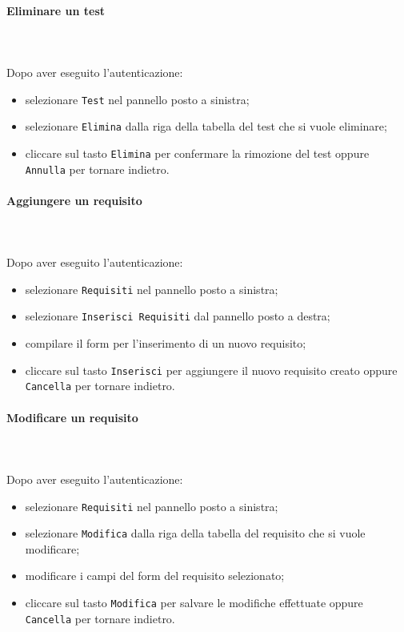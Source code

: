 	\paragraph{Eliminare un test} \mbox{}\\ \mbox{}\\
	Dopo aver eseguito l'autenticazione:
	\begin{itemize}
		\item selezionare \texttt{Test} nel pannello posto a sinistra;
		\item selezionare \texttt{Elimina} dalla riga della tabella del test
		che si vuole eliminare;\
		\item cliccare sul tasto \texttt{Elimina} per confermare la rimozione del test
		oppure \texttt{Annulla} per tornare indietro.
	\end{itemize}		
	
	\paragraph{Aggiungere un requisito} \mbox{}\\ \mbox{}\\
	Dopo aver eseguito l'autenticazione:
	\begin{itemize}
		\item selezionare \texttt{Requisiti} nel pannello posto a sinistra;
		\item selezionare \texttt{Inserisci Requisiti} dal pannello posto a destra;
		\item compilare il form per l'inserimento di un nuovo requisito;
		\item cliccare sul tasto \texttt{Inserisci} per aggiungere il nuovo requisito
		creato oppure \texttt{Cancella} per tornare indietro.	
	\end{itemize}
	
	\paragraph{Modificare un requisito} \mbox{}\\ \mbox{}\\
	Dopo aver eseguito l'autenticazione:
	\begin{itemize}
		\item selezionare \texttt{Requisiti} nel pannello posto a sinistra;
		\item selezionare \texttt{Modifica} dalla riga della tabella del requisito
		che si vuole modificare;
		\item modificare i campi del form del requisito selezionato;
		\item cliccare sul tasto \texttt{Modifica} per salvare le modifiche effettuate
		oppure \texttt{Cancella} per tornare indietro.
	\end{itemize}
	
